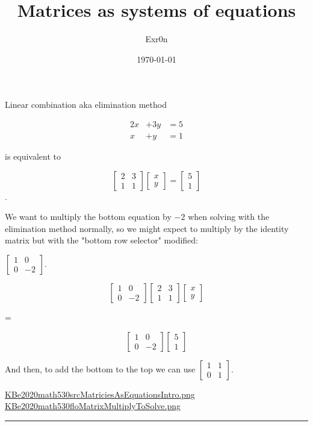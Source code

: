 \documentclass[letterpaper]{article}
\author{Exr0n}
\date{\today}
\title{Matrices as systems of equations}
\renewcommand\maketitle{}
\begin{document}
\maketitle
Linear combination aka elimination method

\begin{align}
2x &+ 3y &= 5 \\
 x &+  y &= 1
\end{align}

is equivalent to

\[
\left[\begin{matrix}
2 &3 \\
1 &1
\end{matrix}\right]
\left[\begin{matrix}x\\y\end{matrix}\right]
=
\left[\begin{matrix}5\\1\end{matrix}\right]
\].

We want to multiply the bottom equation by \(-2\) when solving with the
elimination method normally, so we might expect to multiply by the
identity matrix but with the "bottom row selector" modified:

\(\left[\begin{matrix}1&0\\0&-2\end{matrix}\right]\).

\[
\left[\begin{matrix} 1 &0 \\ 0 &-2\end{matrix}\right]
\left[\begin{matrix} 2 &3 \\ 1 &1 \end{matrix}\right]
\left[\begin{matrix} x \\ y \end{matrix}\right]
\]

=

\[
\left[\begin{matrix} 1 &0 \\ 0 &-2\end{matrix}\right]
\left[\begin{matrix} 5 \\ 1\end{matrix}\right]
\]

And then, to add the bottom to the top we can use
\(\left[\begin{matrix}1&1\\0&1\end{matrix}\right]\).

\href{KBe2020math530srcMatriciesAsEquationsIntro.png.org}{KBe2020math530srcMatriciesAsEquationsIntro.png}
\href{KBe2020math530floMatrixMultiplyToSolve.png.org}{KBe2020math530floMatrixMultiplyToSolve.png}

\noindent\rule{\textwidth}{0.5pt}
\end{document}
